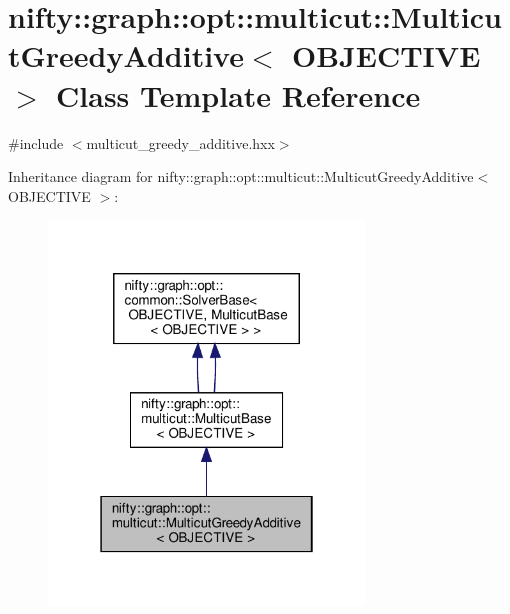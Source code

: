 \hypertarget{classnifty_1_1graph_1_1opt_1_1multicut_1_1MulticutGreedyAdditive}{}\section{nifty\+:\+:graph\+:\+:opt\+:\+:multicut\+:\+:Multicut\+Greedy\+Additive$<$ O\+B\+J\+E\+C\+T\+I\+VE $>$ Class Template Reference}
\label{classnifty_1_1graph_1_1opt_1_1multicut_1_1MulticutGreedyAdditive}


{\ttfamily \#include $<$multicut\+\_\+greedy\+\_\+additive.\+hxx$>$}



Inheritance diagram for nifty\+:\+:graph\+:\+:opt\+:\+:multicut\+:\+:Multicut\+Greedy\+Additive$<$ O\+B\+J\+E\+C\+T\+I\+VE $>$\+:
\nopagebreak
\begin{figure}[H]
\begin{center}
\leavevmode
\includegraphics[width=238pt]{classnifty_1_1graph_1_1opt_1_1multicut_1_1MulticutGreedyAdditive__inherit__graph}
\end{center}
\end{figure}


